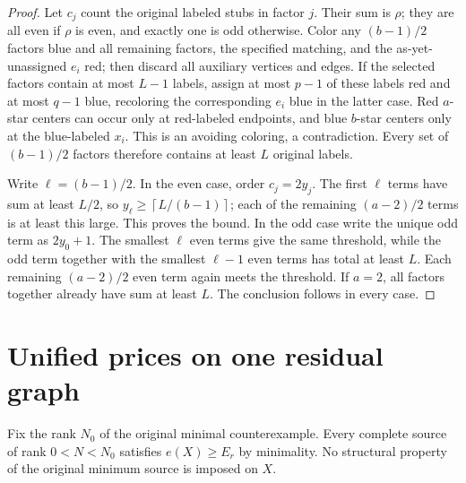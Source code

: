 \documentclass[11pt,a4paper]{article}
\newcommand{\ceil}[1]{\left\lceil#1\right\rceil}
\theoremstyle{definition}
\begin{document}
\begin{proof}
Let $c_j$ count the original labeled stubs in factor $j$. Their sum is $\rho$; they are all even if $\rho$ is even, and exactly one is odd otherwise. Color any $(b-1)/2$ factors blue and all remaining factors, the specified matching, and the as-yet-unassigned $e_i$ red; then discard all auxiliary vertices and edges. If the selected factors contain at most $L-1$ labels, assign at most $p-1$ of these labels red and at most $q-1$ blue, recoloring the corresponding $e_i$ blue in the latter case. Red $a$-star centers can occur only at red-labeled endpoints, and blue $b$-star centers only at the blue-labeled $x_i$. This is an avoiding coloring, a contradiction. Every set of $(b-1)/2$ factors therefore contains at least $L$ original labels.

Write $\ell=(b-1)/2$. In the even case, order $c_j=2y_j$. The first $\ell$ terms have sum at least $L/2$, so $y_\ell\ge\ceil{L/(b-1)}$; each of the remaining $(a-2)/2$ terms is at least this large. This proves the bound. In the odd case write the unique odd term as $2y_0+1$. The smallest $\ell$ even terms give the same threshold, while the odd term together with the smallest $\ell-1$ even terms has total at least $L$. Each remaining $(a-2)/2$ even term again meets the threshold. If $a=2$, all factors together already have sum at least $L$. The conclusion follows in every case.
\end{proof}


\section{Unified prices on one residual graph}\label{app:prices}
Fix the rank $N_0$ of the original minimal counterexample. Every complete source of rank $0<N<N_0$ satisfies $e(X)\ge E_r$ by minimality. No structural property of the original minimum source is imposed on $X$.
\end{document}
